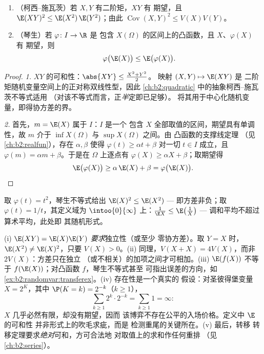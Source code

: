 \begin{theorem}[柯西--施瓦茨不等式与琴生不等式]\label{thm:b2:randomvar:jensen}
\leavevmode
\begin{enumerate}
\item （柯西--施瓦茨）若 $X, Y$ 有二阶矩，$XY$ 有
期望，且 $\E(XY)^2 \leq \E(X^2)\,\E(Y^2)$；由此
$\operatorname{Cov}(X,Y)^2 \leq V(X)V(Y)$。
\item （琴生）若 $\varphi \colon I \to \R$ 是
包含 $X(\Omega)$ 的区间上的凸函数，且 $X$、$\varphi(X)$ 有
期望，则
\[
\varphi\bigl(\E(X)\bigr) \leq \E\bigl(\varphi(X)\bigr) .
\]
\end{enumerate}
\end{theorem}

\begin{proof}
\emph{1.} $XY$ 的可和性：$\abs{XY} \leq \frac{X^2 + Y^2}2$。
映射 $(X, Y) \mapsto \E(XY)$ 是
二阶矩随机变量空间上的正对称双线性型，因此
\cref{ch:b2:quadratic} 中的抽象柯西--施瓦茨不等式适用
（对该不等式而言，正\emph{半}定即已足够）。
将其用于中心化随机变量，即得协方差的界。

\emph{2.} 首先，$m = \E(X)$ 属于 $I$：$I$ 是一个
包含 $X$ 全部取值的区间，期望具有单调性，故 $m$
介于 $\inf X(\Omega)$ 与 $\sup X(\Omega)$ 之间。由
凸函数的支撑线定理
（见\cref{ch:b2:realfun}），存在 $\alpha, \beta$ 使得
$\varphi(t) \geq \alpha t + \beta$ 对一切 $t \in I$ 成立，且
$\varphi(m) = \alpha m + \beta$。于是在 $\Omega$ 上逐点有
$\varphi(X) \geq \alpha X + \beta$；取期望得
\[
\E\bigl(\varphi(X)\bigr) \geq \alpha\,\E(X) + \beta
= \varphi\bigl(\E(X)\bigr). \qedhere
\]
\end{proof}

\begin{example}
取 $\varphi(t) = t^2$，琴生不等式给出 $\E(X)^2 \leq \E(X^2)$ ---
即方差非负；取 $\varphi(t) = 1/t$，其定义域为
$\intoo{0}{\infty}$ 上：$\frac{1}{\E X} \leq \E\bigl(\frac1X\bigr)$
--- 调和平均不超过算术平均，此处即
其随机形式。
\end{example}

\begin{remark}[常见陷阱]
(i) $\E(XY) = \E(X)\E(Y)$ \emph{要求}独立性（或至少
零协方差）。取 $Y = X$ 时，$\E(X^2) \neq
\E(X)^2$，只要 $V(X) > 0$。(ii) 同理，$V(X + X) =
4V(X)$，而非 $2V(X)$：方差只在独立
（或不相关）的加项之间才可相加。(iii) $\E(f(X))$ 不等于
$f(\E(X))$；对凸函数 $f$，琴生不等式甚至
可指出误差的方向，如
\cref{ex:b2:randomvar:transferex}。(iv) 存在性是一个真实的
假设：对圣彼得堡变量 $X = 2^K$，其中
$\P(K = k) = 2^{-k}$（$k \geq 1$），
\[
\sum_{k\geq1}2^k\cdot2^{-k} = \sum_{k\geq1}1 = \infty :
\]
$X$ 几乎必然有限，却没有期望，因而
该博弈不存在公平的入场价格。定义中 $\E$ 的可和性
并非形式上的吹毛求疵，而是
检测重尾的关键所在。(v) 最后，转移
转移定理要求\emph{绝对}可和，方可合法地
对取值上的求和作任何重排
（见\cref{ch:b2:series}）。
\end{remark}


